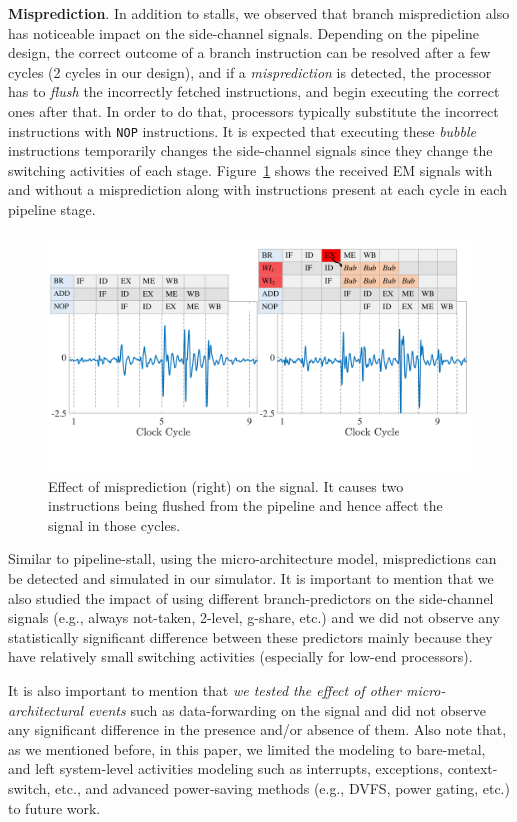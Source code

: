 \documentclass[11 pt]{article}
\begin{document}
\noindent\textbf{Misprediction}. In addition to stalls, we observed that branch misprediction also has noticeable impact on the side-channel signals. Depending on the pipeline design, the correct outcome of a branch instruction can be resolved after a few cycles (2 cycles in our design), and if a \textit{misprediction} is detected, the processor has to \textit{flush} the incorrectly fetched instructions, and begin executing the correct ones after that. In order to do that, processors typically substitute the incorrect instructions with {\tt NOP} instructions. It is expected that executing these \textit{bubble} instructions temporarily changes the side-channel signals since they change the switching activities of each stage. Figure~\ref{fig:mis} shows the received EM signals with and without a misprediction along with instructions present at each cycle in each pipeline stage.
\begin{figure}
	\centering
	\includegraphics[width=0.4\columnwidth,clip]{figure/mise2.pdf}
	\caption{Effect of misprediction (right) on the signal. It causes two instructions being flushed from the pipeline and hence affect the signal in those cycles.}
	\label{fig:mis}
\end{figure}

Similar to pipeline-stall, using the micro-architecture model, mispredictions can be detected and simulated in our simulator. It is important to mention that we also studied the impact of using  different branch-predictors on the side-channel signals (e.g., always not-taken, 2-level, g-share, etc.) and we did not observe any statistically significant difference between these predictors mainly because they have relatively small switching activities (especially for low-end processors).

It is also important to mention that \textit{we tested the effect of other micro-architectural events} such as data-forwarding on the signal and did not observe any significant difference in the presence and/or absence of them. Also note that, as we mentioned before, in this paper, we limited the modeling to bare-metal, and left system-level activities modeling such as interrupts, exceptions, context-switch, etc., and advanced power-saving methods (e.g., DVFS, power gating, etc.) to future work.
\end{document}
